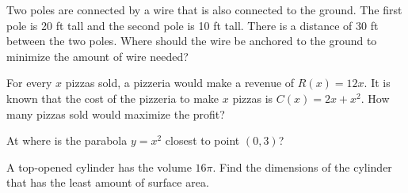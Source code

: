\begin{exercise}

Two poles are connected by a wire that is also connected to the ground.
The first pole is 20 ft tall and the second pole is 10 ft tall. There is
a distance of 30 ft between the two poles. Where should the wire be
anchored to the ground to minimize the amount of wire needed?

\end{exercise}
\vspace*{6\baselineskip}

\begin{exercise}

For every \(x\) pizzas sold, a pizzeria would make a revenue of
\(R(x)=12x\). It is known that the cost of the pizzeria to make \(x\)
pizzas is \(C(x)=2x+x^2\). How many pizzas sold would maximize the
profit?

\end{exercise}
\vspace*{6\baselineskip}

\begin{exercise}

At where is the parabola \(y=x^2\) closest to point \((0,3)\)?

\end{exercise}
\vspace*{6\baselineskip}

\begin{exercise}

A top-opened cylinder has the volume \(16\pi\). Find the dimensions of
the cylinder that has the least amount of surface area.

\end{exercise}

